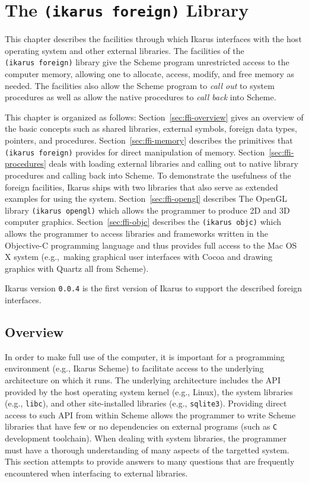\documentclass[onecolumn, 12pt, twoside, openright, dvipdfm]{book}
\begin{document}
\chapter{\label{chapter:foreign}The \texttt{(ikarus foreign)} Library}

This chapter describes the facilities through which Ikarus
interfaces with the host operating system and other external
libraries.  The facilities of the \texttt{(ikarus~foreign)}
library give the Scheme program unrestricted access to the computer
memory, allowing one to allocate, access, modify, and free memory as
needed.  The facilities also allow the Scheme program to \emph{call
out} to system procedures as well as allow the native procedures to
\emph{call back} into Scheme.  

This chapter is organized as follows: Section~\ref{sec:ffi-overview}
gives an overview of the basic concepts such as shared libraries,
external symbols, foreign data types, pointers, and procedures.
Section~\ref{sec:ffi-memory} describes the primitives that
\texttt{(ikarus~foreign)} provides for direct manipulation of
memory.  Section~\ref{sec:ffi-procedures} deals with loading
external libraries and calling out to native library procedures and
calling back into Scheme.  To demonstrate the usefulness of the
foreign facilities, Ikarus ships with two libraries that also serve
as extended examples for using the system.
Section~\ref{sec:ffi-opengl} describes The OpenGL library
\texttt{(ikarus~opengl)} which allows the programmer to produce 2D
and 3D computer graphics.  Section~\ref{sec:ffi-objc} describes the
\texttt{(ikarus~objc)} which allows the programmer to access
libraries and frameworks written in the Objective-C programming
language and thus provides full access to the Mac OS X system
(e.g.,~making graphical user interfaces with Cocoa and drawing
graphics with Quartz all from Scheme).

Ikarus version \texttt{0.0.4} is the first version of Ikarus to
support the described foreign interfaces.
\newpage

\section{\label{sec:ffi-overview}Overview}

In order to make full use of the computer, it is important for a
programming environment (e.g., Ikarus Scheme) to facilitate access
to the underlying architecture on which it runs.  The underlying
architecture includes the API provided by the host operating system
kernel (e.g., Linux), the system libraries (e.g., \texttt{libc}),
and other site-installed libraries (e.g., \texttt{sqlite3}).
Providing direct access to such API from within Scheme allows the
programmer to write Scheme libraries that have few or no
dependencies on external programs (such as \texttt{C} development
toolchain).  When dealing with system libraries, the programmer
must have a thorough understanding of many aspects of the targetted 
system.  This section attempts to provide answers to many questions
that are frequently encountered when interfacing to external
libraries.
\end{document}
